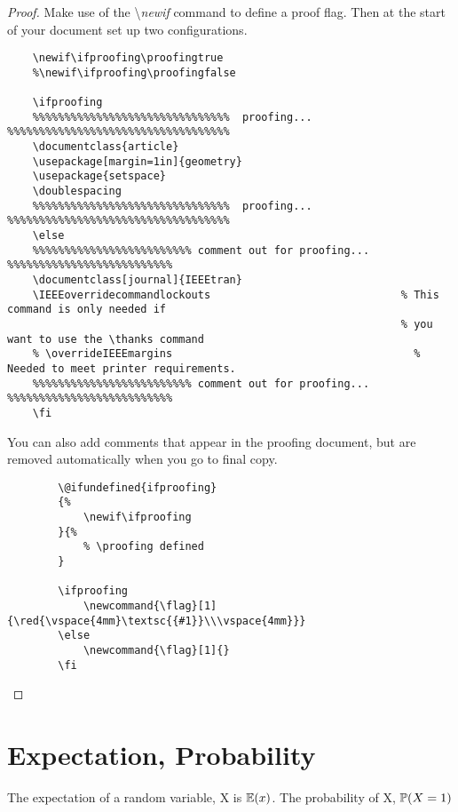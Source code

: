 \documentclass{article}
\begin{document}
\begin{proof}

    Make use of the \textbackslash \textit{newif} command to define a proof flag. Then at the start of your document set up two configurations.
    \begin{lstlisting}
    \newif\ifproofing\proofingtrue
    %\newif\ifproofing\proofingfalse
    
    \ifproofing
    %%%%%%%%%%%%%%%%%%%%%%%%%%%%%%%  proofing... %%%%%%%%%%%%%%%%%%%%%%%%%%%%%%%%%%%
    \documentclass{article}
    \usepackage[margin=1in]{geometry}
    \usepackage{setspace}
    \doublespacing
    %%%%%%%%%%%%%%%%%%%%%%%%%%%%%%%  proofing... %%%%%%%%%%%%%%%%%%%%%%%%%%%%%%%%%%%
    \else
    %%%%%%%%%%%%%%%%%%%%%%%%% comment out for proofing... %%%%%%%%%%%%%%%%%%%%%%%%%%
    \documentclass[journal]{IEEEtran}
    \IEEEoverridecommandlockouts                              % This command is only needed if 
                                                              % you want to use the \thanks command
    % \overrideIEEEmargins                                      % Needed to meet printer requirements.
    %%%%%%%%%%%%%%%%%%%%%%%%% comment out for proofing... %%%%%%%%%%%%%%%%%%%%%%%%%%
    \fi
    \end{lstlisting}

    \newpage
    You can also add comments that appear in the proofing document, but are removed automatically when you go to final copy.  

    \begin{lstlisting}
        \@ifundefined{ifproofing} 
        {%
            \newif\ifproofing
        }{%
            % \proofing defined
        }  
        
        \ifproofing
            \newcommand{\flag}[1]{\red{\vspace{4mm}\textsc{{#1}}\\\vspace{4mm}}}
        \else
            \newcommand{\flag}[1]{}
        \fi 
    \end{lstlisting}

\end{proof}


\section{Expectation, Probability}

The expectation of a random variable, X is $\mathbb{E}(x)$.  The probability of X, $\mathbb{P}(X = 1)$
\end{document}
